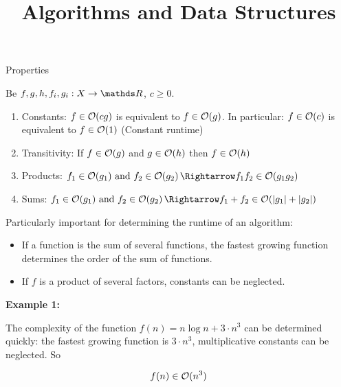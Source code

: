 \documentclass[11pt,compress,t,notes=noshow, xcolor=table]{beamer}
\title{Algorithms and Data Structures}
\begin{document}


\begin{vbframe}{Properties}

Be $f, g, h, f_i, g_i: X \to \R$, $c \ge 0$.

\begin{enumerate}
  \item Constants: $f \in \mathcal{O}(c g)$ is equivalent to $f \in \mathcal{O}(g)$. In particular: $f \in \mathcal{O}(c)$ is equivalent to $f \in \mathcal{O}(1)$ (Constant runtime)
  \item Transitivity: If $f \in \mathcal{O}(g)$ and $g \in \mathcal{O}(h)$ then $f \in \mathcal{O}(h)$
  \item Products: $f_{1} \in \order(g_{1}){\text{ and }}f_{2} \in \order(g_{2})\,\Rightarrow f_{1}f_{2} \in \order(g_{1}g_{2})$
  \item Sums: $f_{1}\in \order(g_{1}){\text{ and }}f_{2} \in \order(g_{2})\,\Rightarrow f_{1}+f_{2} \in \order(|g_{1}|+|g_{2}|)$
\end{enumerate}

\vfill

\framebreak

Particularly important for determining the runtime of an algorithm:
\begin{itemize}
   \item If a function is the sum of several functions, the fastest growing function determines the order of the sum of functions.
  \item If $f$ is a product of several factors, constants can be neglected.
\end{itemize}

\lz

\textbf{Example 1: }

The complexity of the function $f(n) = n \log n + 3 \cdot n^3$ can be determined quickly: the fastest growing function is $3 \cdot n^3$, multiplicative constants can be neglected. So

$$
f(n) \in \mathcal{O}(n^3)
$$

\end{vbframe}
\end{document}
